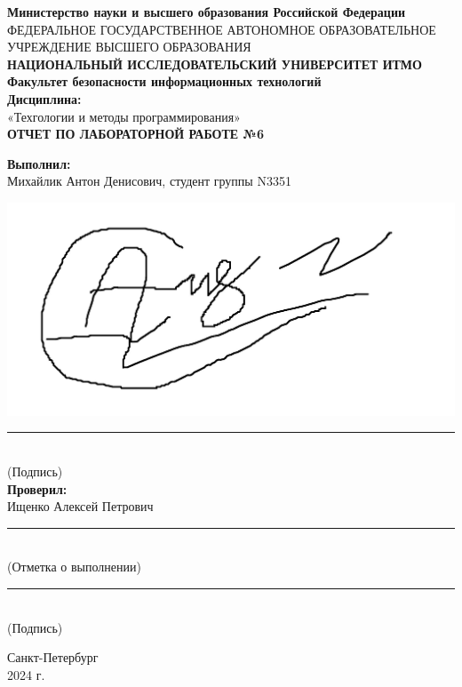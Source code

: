 \documentclass[a4paper, 12pt]{article}
\begin{document}
\thispagestyle{empty}
\begin{center}
    \textbf{Министерство науки и высшего образования Российской Федерации}\\
    ФЕДЕРАЛЬНОЕ ГОСУДАРСТВЕННОЕ АВТОНОМНОЕ ОБРАЗОВАТЕЛЬНОЕ УЧРЕЖДЕНИЕ ВЫСШЕГО ОБРАЗОВАНИЯ\\
    \textbf{НАЦИОНАЛЬНЫЙ ИССЛЕДОВАТЕЛЬСКИЙ УНИВЕРСИТЕТ ИТМО}\\[40pt]
    \textbf{Факультет безопасности информационных технологий}\\[40pt]
    \textbf{Дисциплина:}\\[10pt]
    «Техгологии и методы программирования»\\[30pt]
    \textbf{ОТЧЕТ ПО ЛАБОРАТОРНОЙ РАБОТЕ №6}\\[148pt]
\end{center}
\begin{flushright}
    \textbf{Выполнил:}\\[5pt]
    Михайлик Антон Денисович, студент группы N3351
    \begin{minipage}{0.7\textwidth}
        \hfill 
        \end{minipage}%
        \hfill
        \begin{minipage}{0.2\textwidth}
          \includegraphics[width=\linewidth]{sig.jpg}
    \end{minipage}
    \rule{150pt}{1.5pt}\\
    (Подпись)\\[20pt]

    \textbf{Проверил:}\\[5pt]
    Ищенко Алексей Петрович\\[20pt]
    \rule{150pt}{1.5pt}\\
    (Отметка о выполнении)\\[20pt]
    \rule{150pt}{1.5pt}\\
    (Подпись)\\[55pt]
\end{flushright}
\begin{center}
    Санкт-Петербург\\[3pt]
    2024 г.
\end{center}
\end{document}
